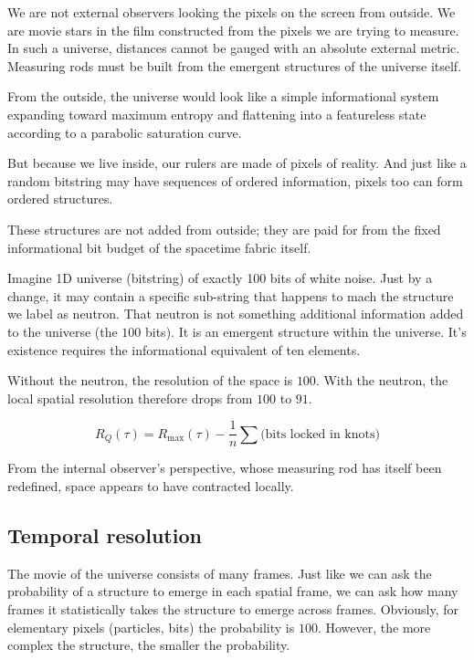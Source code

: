 We are not external observers looking the pixels on the screen from outside. We are movie stars in the film
constructed from the pixels we are trying to measure. 
In such a universe, distances cannot be gauged with an absolute external metric. 
Measuring rods must be built from the emergent structures of the universe itself.

From the outside, the universe would look like a simple informational system expanding toward maximum entropy 
and flattening into a featureless state according to a parabolic saturation curve. 

But because we live inside, our rulers are made of pixels of reality. And just like a random bitstring may have sequences
of ordered information, pixels too can form ordered structures.

These structures are not added from outside; they are paid for from the fixed informational bit budget of the spacetime fabric itself.

Imagine 1D  universe (bitstring) of exactly 100 bits of white noise. Just by a change, it may contain a specific sub-string that happens to
mach the structure we label as neutron.
That neutron is not something additional information added to the universe (the $100$ bits). It is an emergent structure within the universe.
It's existence requires the informational equivalent of ten elements.

Without the neutron, the resolution of the space is $100$. With the neutron, the local spatial resolution therefore drops from $100$ to $91$. 

\begin{equation}
  R_Q(\tau)=R_{\mathrm{max}}(\tau)-\frac{1}{n}\sum\text{(bits locked in knots)}
\end{equation}

From the internal observer's perspective, whose measuring rod has itself been redefined, space appears to have contracted locally.


\subsection{Temporal resolution}

The movie of the universe consists of many frames. Just like we can ask the probability of a structure to emerge in
each spatial frame, we can ask how many frames it statistically takes the structure to emerge across frames.
Obviously, for elementary pixels (particles, bits) the probability is $100$. However, the more complex the structure, the smaller the probability.

